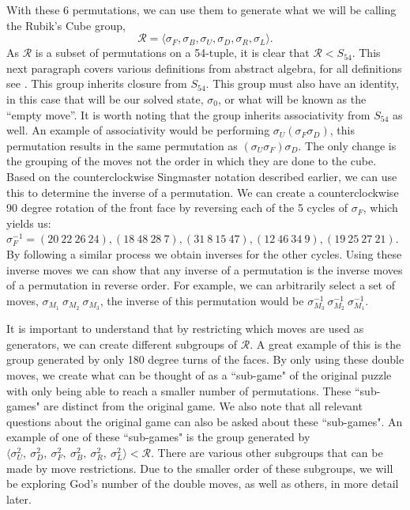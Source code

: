 \documentclass{article}
\begin{document}
With these 6 permutations, we can use them to generate what we will be calling the Rubik's Cube group, $$\mathcal{R} = 
\langle \sigma_F, \sigma_B, \sigma_U, \sigma_D, \sigma_R, \sigma_L \rangle.$$  
As $\mathcal{R}$ is a subset of permutations on a 54-tuple, it is clear that $\mathcal{R} < S_{54}$.  This next paragraph covers various definitions from abstract algebra, for all definitions see \cite{doi:https://doi.org/10.1002/0471469882.ch3}.  This group inherits closure from $S_{54}$.  This group must also have an identity, in this case that will be our solved state, $\sigma_0$, or what will be known as the ``empty move''. It is worth noting that the group inherits associativity from $S_{54}$ as well.  An example of associativity would be performing $\sigma_U (\sigma_F \sigma_D)$, this permutation results in the same permutation as $(\sigma_U \sigma_F) \sigma_D$.  The only change is the grouping of the moves not the order in which they are done to the cube.  Based on the counterclockwise Singmaster notation described earlier, we can use this to determine the inverse of a permutation.  We can create a counterclockwise 90 degree rotation of the front face by reversing each of the 5 cycles of $\sigma_F$, which yields us: $\sigma_F^{-1} = (20\ 22\ 26\ 24), (18\ 48\ 28\ 7), (31\ 8\ 15\ 47), (12\ 46\ 34\ 9), (19\ 25\ 27\ 21)$.  By following a similar process we obtain inverses for the other cycles.  Using these inverse moves we can show that any inverse of a permutation is the inverse moves of a permutation in reverse order.  For example, we can arbitrarily select a set of moves, $\sigma_{M_1}\ \sigma_{M_2}\ \sigma_{M_3}$, the inverse of this permutation would be $\sigma_{M_3}^{-1}\ \sigma_{M_2}^{-1}\ \sigma_{M_1}^{-1}$.

It is important to understand that by restricting which moves are used as generators, we can create different subgroups of $\mathcal{R}$.  A great example of this is the group generated by only 180 degree turns of the faces.  By only using these double moves, we create what can be thought of as a ``sub-game" of the original puzzle with only being able to reach a smaller number of permutations.  These ``sub-games" are distinct from the original game.  We also note that all relevant questions about the original game can also be asked about these ``sub-games".  An example of one of these ``sub-games" is the group generated by $\langle \sigma_U^2,\ \sigma_D^2,\ \sigma_F^2,\ \sigma_B^2,\ \sigma_R^2,\ \sigma_L^2 \rangle < \mathcal{R}$.  There are various other subgroups that can be made by move restrictions.  Due to the smaller order of these subgroups, we will be exploring God's number of the double moves, as well as others, in more detail later.
\end{document}
